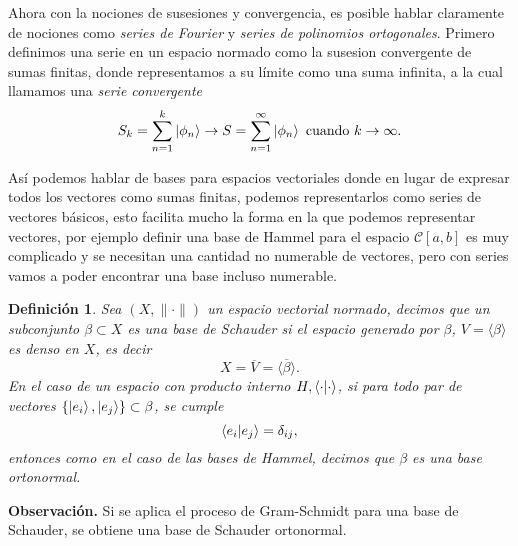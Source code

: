 \documentclass[letterpaper]{book}
\newtheorem{def.}{Definici\'on}[section]
\newcommand{\obs}{{\noindent \sc \textbf{Observación. }}}
\begin{document}
Ahora con la nociones de susesiones y convergencia, es posible hablar claramente de nociones como \emph{series de Fourier} y \emph{series de polinomios ortogonales}. Primero definimos una serie en un espacio normado como la susesion convergente de sumas finitas, donde representamos a su límite como una suma infinita, a la cual llamamos una \emph{serie convergente}
\[
    S_k=\sum_{n=1}^k\ket{\phi_n}\rightarrow S=\sum_{n=1}^{\infty}\ket{\phi_n}\text{ cuando }k\rightarrow\infty.
\]

Así podemos hablar de bases para espacios vectoriales donde en lugar de expresar todos los vectores como sumas finitas, podemos representarlos como series de vectores básicos, esto facilita mucho la forma en la que podemos representar vectores, por ejemplo definir una base de Hammel para el espacio \(\mathcal{C}[a,b]\) es muy complicado y se necesitan una cantidad no numerable de vectores, pero con series vamos a poder encontrar una base incluso numerable.

\begin{def.}
  Sea \((X,\|\cdot\|)\) un espacio vectorial normado, decimos que un subconjunto \(\beta\subset X\) es una base de Schauder si el espacio generado por \(\beta\), \(V=\langle\beta\rangle\) es denso en \(X\), es decir
  \[
    X=\overline{V}=\overline{\langle\beta\rangle}.
  \]
  En el caso de un espacio con producto interno \(H,\braket{\cdot|\cdot}\), si para todo par de vectores \(\{\ket{e_i},\ket{e_j}\}\subset\beta\), se cumple
  \[
    \braket{e_i|e_j}=\delta_{ij},
  \]
  entonces como en el caso de las bases de Hammel, decimos que \(\beta\) es una base \emph{ortonormal}.
  \end{def.}
\obs Si se aplica el proceso de Gram-Schmidt para una base de Schauder, se obtiene una base de Schauder ortonormal.\\
\end{document}
